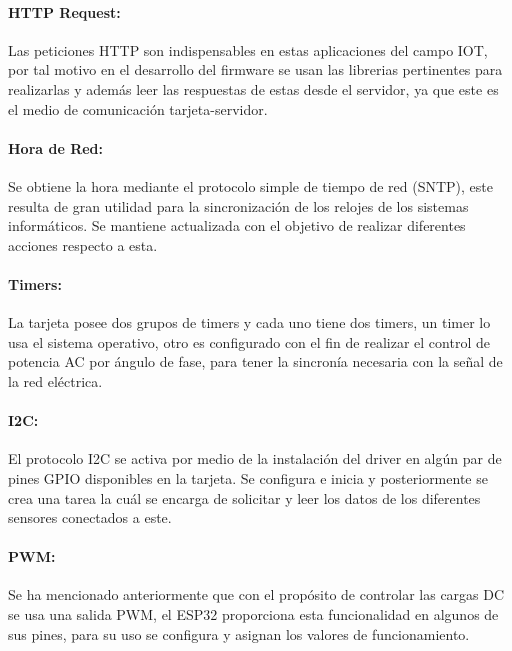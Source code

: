 \paragraph{HTTP Request:}

Las peticiones HTTP son indispensables en estas aplicaciones del campo IOT, por tal motivo en el desarrollo del firmware se usan las librerias pertinentes para realizarlas y además leer las respuestas de estas desde el servidor, ya que este es el medio de comunicación tarjeta-servidor.

\paragraph{Hora de Red:}

Se obtiene la hora mediante el protocolo simple de tiempo de red (SNTP), este resulta de gran utilidad para la sincronización de los relojes de los sistemas informáticos. Se mantiene actualizada con el objetivo de realizar diferentes acciones respecto a esta.

\paragraph{Timers:}

La tarjeta posee dos grupos de timers y cada uno tiene dos timers, un timer lo usa el sistema operativo, otro es configurado con el fin de realizar el control de potencia AC por ángulo de fase, para tener la sincronía necesaria con la señal de la red eléctrica.

\paragraph{I2C:}

El protocolo I2C se activa por medio de la instalación del driver en algún par de pines GPIO disponibles en la tarjeta. Se configura e inicia y posteriormente se crea una tarea la cuál se encarga de solicitar y leer los datos de los diferentes sensores conectados a este.

\paragraph{PWM:}

Se ha mencionado anteriormente que con el propósito de controlar las cargas DC se usa una salida PWM, el ESP32 proporciona esta funcionalidad en algunos de sus pines, para su uso se configura y asignan los valores de funcionamiento.

